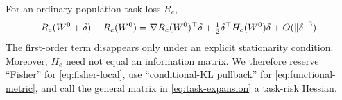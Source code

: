 For an ordinary population task loss \(R_e\),
\begin{equation}
R_e(W^0+\delta)-R_e(W^0)
=\nabla R_e(W^0)^\top\delta
+\tfrac12\delta^\top H_e(W^0)\delta
+O(\left\lVert \delta\right\rVert^3).
\label{eq:task-expansion}
\end{equation}
The first-order term disappears only under an explicit stationarity condition. Moreover, \(H_e\) need not equal an information matrix. We therefore reserve ``Fisher'' for \cref{eq:fisher-local}, use ``conditional-KL pullback'' for \cref{eq:functional-metric}, and call the general matrix in \cref{eq:task-expansion} a task-risk Hessian.
